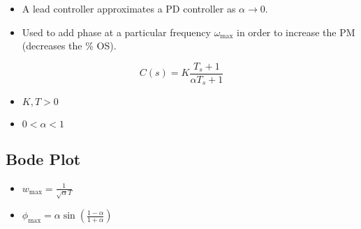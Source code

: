 \begin{motivation}
    \begin{itemize}
        \item A lead controller approximates a PD controller as $\alpha \to 0$.
        \item Used to add phase at a particular frequency $\omega_{\max}$ in order to increase the PM (decreases the \% OS).
    \end{itemize}
\end{motivation}

\begin{definition}
    \begin{equation}
        C(s) = K \frac{T_s + 1}{\alpha T_s + 1}
    \end{equation}
    \begin{itemize}
        \item $K, T > 0$
        \item $0 < \alpha < 1$
    \end{itemize}
\end{definition}

\subsection{Bode Plot}
\begin{notes}
    \begin{itemize}
        \item $w_{\max} = \frac{1}{\sqrt{\alpha} T}$
        \item $\phi_{\max} = \alpha \sin \left(\frac{1-\alpha}{1+\alpha}\right)$
    \end{itemize}
\end{notes}


